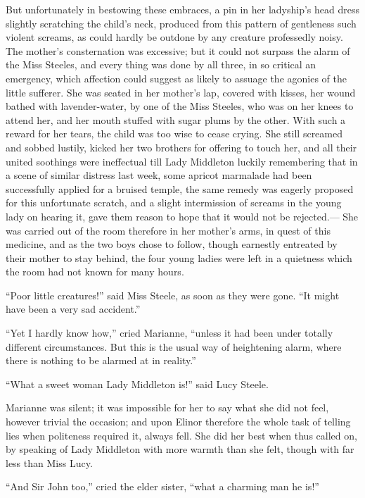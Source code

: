 But unfortunately in bestowing these embraces,
a pin in her ladyship's head dress slightly scratching
the child's neck, produced from this pattern of gentleness
such violent screams, as could hardly be outdone by any
creature professedly noisy.  The mother's consternation
was excessive; but it could not surpass the alarm of the
Miss Steeles, and every thing was done by all three,
in so critical an emergency, which affection could suggest
as likely to assuage the agonies of the little sufferer.
She was seated in her mother's lap, covered with kisses,
her wound bathed with lavender-water, by one of the
Miss Steeles, who was on her knees to attend her,
and her mouth stuffed with sugar plums by the other.
With such a reward for her tears, the child was too wise
to cease crying.  She still screamed and sobbed lustily,
kicked her two brothers for offering to touch her, and all
their united soothings were ineffectual till Lady Middleton
luckily remembering that in a scene of similar distress
last week, some apricot marmalade had been successfully
applied for a bruised temple, the same remedy was eagerly
proposed for this unfortunate scratch, and a slight
intermission of screams in the young lady on hearing it,
gave them reason to hope that it would not be rejected.---%
She was carried out of the room therefore in her
mother's arms, in quest of this medicine, and as the
two boys chose to follow, though earnestly entreated
by their mother to stay behind, the four young ladies
were left in a quietness which the room had not known for
many hours.

``Poor little creatures!'' said Miss Steele, as soon
as they were gone.  ``It might have been a very sad accident.''

``Yet I hardly know how,'' cried Marianne, ``unless it
had been under totally different circumstances.
But this is the usual way of heightening alarm, where there
is nothing to be alarmed at in reality.''

``What a sweet woman Lady Middleton is!'' said Lucy Steele.

Marianne was silent; it was impossible for her to say
what she did not feel, however trivial the occasion;
and upon Elinor therefore the whole task of telling lies
when politeness required it, always fell.  She did her
best when thus called on, by speaking of Lady Middleton
with more warmth than she felt, though with far less than
Miss Lucy.

``And Sir John too,'' cried the elder sister,
``what a charming man he is!''

